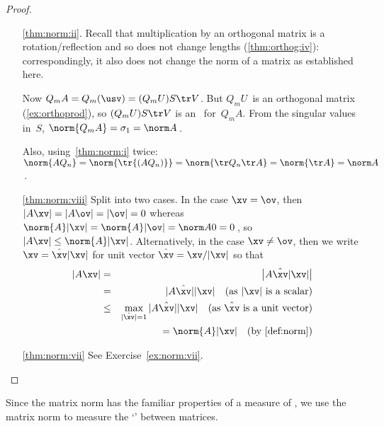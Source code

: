 \begin{proof}
\begin{itemize}
\item[\ref{thm:norm:ii}.]
Recall that multiplication by an orthogonal matrix is a rotation\slash reflection and so does not change lengths (\autoref{thm:orthog:iv}): correspondingly, it also does not change the norm of a matrix as established here.

Now \(Q_mA=Q_m(\usv)=(Q_mU)S\tr V\).
But \(Q_mU\)~is an orthogonal matrix (\autoref{ex:orthoprod}),
so \((Q_mU)S\tr V\) is an \svd\ for~\(Q_mA\).
From the singular values in~\(S\), \(\norm{Q_mA}=\sigma_1=\norm A\)\,.

Also, using~\ref{thm:norm:i} twice: \(\norm{AQ_n}=\norm{\tr{(AQ_n)}}=\norm{\tr Q_n\tr A}=\norm{\tr A}=\norm A\)\,.

\item[\ref{thm:norm:viii}]
Split into two cases.
In the case \(\xv=\ov\), then \(|A\xv|=|A\ov|=|\ov|=0\) whereas \(\norm{A}|\xv|=\norm{A}|\ov|=\norm A0=0\)\,, so \(|A\xv|\leq\norm{A}|\xv|\).
Alternatively, in the case \(\xv\neq\ov\), then we write \(\xv=\hat{\xv}|\xv|\) for unit vector \(\hat{\xv}=\xv/|\xv|\)  so that
\begin{eqnarray*}
|A\xv|&=&\big|A\hat{\xv}|\xv|\big|
\\&=&|A\hat{\xv}||\xv| \quad(\text{as }|\xv|\text{ is a scalar})
\\&\leq&\max_{|\hat{\xv}|=1}|A\hat{\xv}||\xv|
\quad(\text{as }\hat{\xv}\text{ is a unit vector})
\\&&{}=\norm{A}|\xv|\quad(\text{by \autoref{def:norm}})
\end{eqnarray*}


\item[\ref{thm:norm:vii}] See {Exercise}~\ref{ex:norm:vii}.
\end{itemize}
\end{proof}




Since the matrix norm has the familiar properties of a measure of , we use the matrix norm to measure the `' between matrices.


